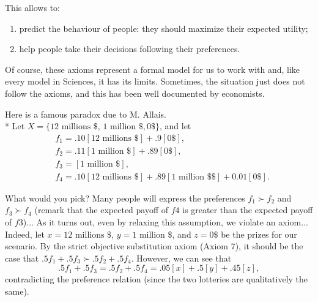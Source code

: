 This allows to:
\begin{enumerate}
\item predict the behaviour of people:  they should maximize their expected utility;
\item help people take their decisions following their preferences.
\end{enumerate}

Of course, these axioms represent a formal model for us to work with and, like every model in Sciences, it has its limits.  Sometimes, the situation just does not follow the axioms, and this has been well documented by economists.

\begin{example}
\label{ch1:paradoxAllais}
Here is a famous paradox due to M. Allais.\\*
Let $X = \{12 \text{ millions \$}, \, 1 \text{ million \$}, 0 \$ \}$, 
and let
\begin{equation}
\begin{aligned}
&f_1 = .10[12 \text{ millions \$}] + .9[0 \$ ], \\
&f_2 = .11[1 \text{ million \$}] + .89[0 \$ ], \\
&f_3 = [1 \text{ million \$}], \\
&f_4 = .10[12 \text{ millions \$}] + .89[1 \text{ million \$} \$ ] + 0.01[0 \$].
\end{aligned}
\end{equation}

What would you pick? Many people will express the preferences $f_1 \succ f_2$ and $f_3\succ f_4$ (remark that the expected payoff of $f4$ is greater than the expected payoff of $f3$)...
As it turns out, even by relaxing this assumption, we violate an axiom... 
Indeed, let $x = 12 \text{ millions \$}$, $y = 1 \text{ million \$} $, and $z = 0 \$ $ be the prizes for our scenario.
By the strict objective substitution axiom (Axiom 7), it should be the case that $.5f_1 + .5f_3 \succ .5 f_2 + .5f_4.$
However, we can see that
$$ .5 f_1 + .5 f_3 = .5 f_2 + .5f_4 = .05[x]+.5[y]+.45[z],$$
contradicting the preference relation (since the two lotteries are qualitatively the same).


\end{example}



\ifx \globalmark \undefined %


	
\else 
	
\fi

